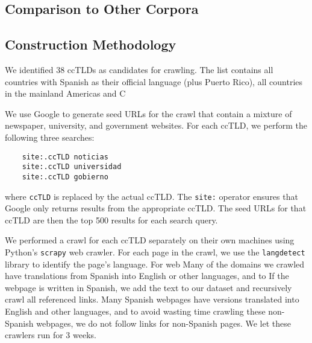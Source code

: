 \documentclass[runningheads]{llncs}
\begin{document}
\subsection{Comparison to Other Corpora}

\subsection{Construction Methodology}


We identified 38 ccTLDs as candidates for crawling.
The list contains all countries with Spanish as their official language (plus Puerto Rico),
all countries in the mainland Americas and C

We use Google to generate seed URLs for the crawl that contain a mixture of newspaper, university, and government websites.
For each ccTLD, we perform the following three searches:
\begin{verbatim}
    site:.ccTLD noticias
    site:.ccTLD universidad
    site:.ccTLD gobierno
\end{verbatim}
where \texttt{ccTLD} is replaced by the actual ccTLD.
The \texttt{site:} operator ensures that Google only returns results from the appropriate ccTLD.
The seed URLs for that ccTLD are then the top 500 results for each search query.

We performed a crawl for each ccTLD separately on their own machines using Python's \texttt{scrapy} web crawler.
For each page in the crawl, we use the \texttt{langdetect} library to identify the page's language.
For web
Many of the domains we crawled have translations from Spanish into English or other languages,
and to
If the webpage is written in Spanish,
we add the text to our dataset and recursively crawl all referenced links.
Many Spanish webpages have versions translated into English and other languages,
and to avoid wasting time crawling these non-Spanish webpages,
we do not follow links for non-Spanish pages.
We let these crawlers run for 3 weeks.
\end{document}
